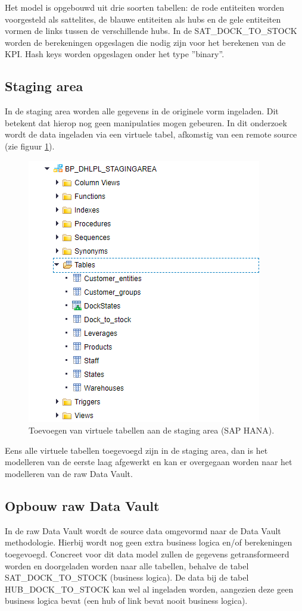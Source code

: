 Het model is opgebouwd uit drie soorten tabellen: de rode entiteiten worden voorgesteld als sattelites, de blauwe entiteiten als hubs en de gele entiteiten vormen de links tussen de verschillende hubs. In de SAT\_DOCK\_TO\_STOCK worden de berekeningen opgeslagen die nodig zijn voor het berekenen van de KPI. Hash keys worden opgeslagen onder het type ''binary''.

\subsection{Staging area}
\label{sec:stagareadv}
In de staging area worden alle gegevens in de originele vorm ingeladen. Dit betekent dat hierop nog geen manipulaties mogen gebeuren. In dit onderzoek wordt de data ingeladen via een virtuele tabel, afkomstig van een remote source (zie figuur \ref{fig:stag}).

\begin{figure}[h]
	\centering
	\includegraphics[scale=0.45]{../images/DV_staging.png}
	\caption{Toevoegen van virtuele tabellen aan de staging area (SAP HANA).}
	\label{fig:stag}
\end{figure}

Eens alle virtuele tabellen toegevoegd zijn in de staging area, dan is het modelleren van de eerste laag afgewerkt en kan er overgegaan worden naar het modelleren van de raw Data Vault.

\subsection{Opbouw raw Data Vault}
In de raw Data Vault wordt de source data omgevormd naar de Data Vault methodologie. Hierbij wordt nog geen extra business logica en/of berekeningen toegevoegd. Concreet voor dit data model zullen de gegevens getransformeerd worden en doorgeladen worden naar alle tabellen, behalve de tabel SAT\_DOCK\_TO\_STOCK (business logica). De data bij de tabel HUB\_DOCK\_TO\_STOCK kan wel al ingeladen worden, aangezien deze geen business logica bevat (een hub of link bevat nooit business logica).

